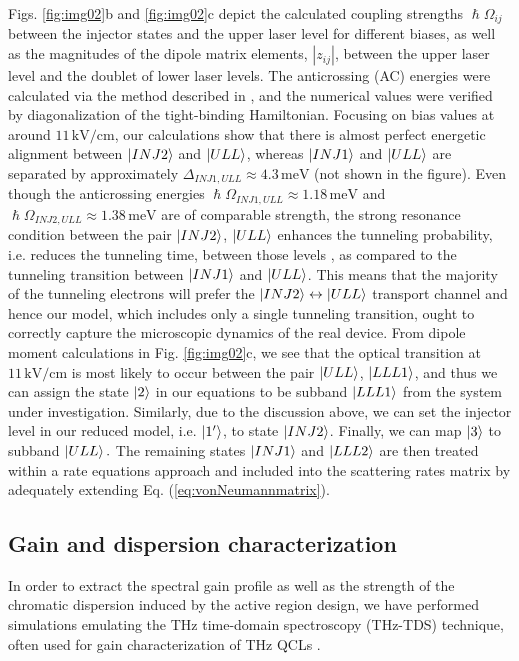 \documentclass[10pt]{article}
\begin{document}
	Figs. \ref{fig:img02}b and \ref{fig:img02}c depict the calculated coupling
	strengths $\hslash\Omega_{ij}$ between the injector states and the upper laser
	level for different biases, as well as the magnitudes of the dipole matrix
	elements, $\left| z_{ij}\right|  $, between the upper laser level and the
	doublet of lower laser levels. The anticrossing (AC) energies were calculated via
	the method described in \cite{bastardwave}, and the numerical values were
	verified by diagonalization of the tight-binding Hamiltonian. Focusing on bias
	values at around $11{\,}\mathrm{kV}/\mathrm{cm}$, our calculations show that
	there is almost perfect energetic alignment between $\Ket{INJ2}\ $and
	$\Ket{ULL}$, whereas $\Ket{INJ1}$ and $\Ket{ULL}$ are separated by
	approximately $\Delta_{INJ1,ULL}\approx4.3{\,}\mathrm{meV}$ (not shown in the
	figure). Even though the anticrossing energies $\hslash\Omega_{INJ1,ULL}%
	\approx1.18{\,}\mathrm{meV}$ and $\hslash\Omega_{INJ2,ULL}\approx1.38{\,}%
	\mathrm{meV}$ are of comparable strength, the strong resonance condition
	between the pair $\Ket{INJ2}$, $\Ket{ULL}$ enhances the tunneling probability,
	i.e. reduces the tunneling time, between those levels
	\cite{williams2007terahertz}, as compared to the tunneling transition between
	$\Ket{INJ1}$ and $\Ket{ULL}$. This means that the majority of the tunneling
	electrons will prefer the $\Ket{INJ2}\leftrightarrow\Ket{ULL}$ transport
	channel and hence our model, which includes only a single tunneling
	transition, ought to correctly capture the microscopic dynamics of the real
	device. From dipole moment calculations in Fig. \ref{fig:img02}c, we see that
	the optical transition at $11{\,}\mathrm{kV}/\mathrm{cm}$ is most likely to
	occur between the pair $\Ket{ULL}$, $\Ket{LLL1}$, and thus we can assign the
	state $\Ket{2}$ in our equations to be subband $\Ket{LLL1}$ from the system
	under investigation. Similarly, due to the discussion above, we can set the
	injector level in our reduced model, i.e. $\Ket{1'}$, to state $\Ket{INJ2}$.
	Finally, we can map $\Ket{3}$ to subband $\Ket{ULL}.$ The remaining states
	$\Ket{INJ1}$ and $\Ket{LLL2}$ are then treated within a rate equations
	approach and included into the scattering rates matrix by adequately extending
	Eq. (\ref{eq:vonNeumannmatrix}).
	
	\subsection{Gain and dispersion characterization}
	\label{subsec:numthztds} 
	In order to extract the spectral gain profile as well
	as the strength of the chromatic dispersion induced by the active region
	design, we have performed simulations emulating the THz time-domain
	spectroscopy (THz-TDS) technique, often used for gain characterization of THz
	QCLs \cite{burghoff2014broadband,jukam2008gain,martl2011gain}.
	
\end{document}
